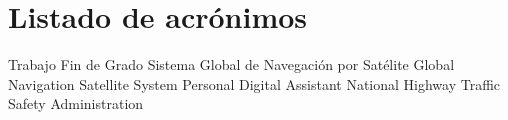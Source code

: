 \chapter{Listado de acrónimos}

{\small
\begin{acronym}[XXXXXXXX]
       {Trabajo Fin de Grado}
      {Sistema Global de Navegación por Satélite}
      {Global Navigation Satellite System}
       {Personal Digital Assistant}
     {National Highway Traffic Safety Administration}
\end{acronym}
}




